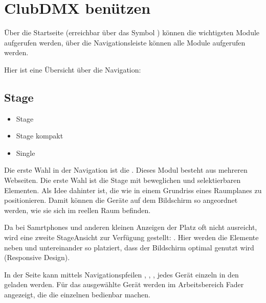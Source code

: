 \documentclass[letterpaper,10pt,ngerman]{sphinxmanual}
\begin{document}
\chapter{ClubDMX benützen}
\label{\detokenize{navigation:clubdmx-benutzen}}\label{\detokenize{navigation:navigation-label}}\label{\detokenize{navigation::doc}}
Über die Startseite (erreichbar über das Symbol ) können die
wichtigsten Module aufgerufen werden, über die Navigationsleiste
können alle Module aufgerufen werden.

Hier ist eine Übersicht über die Navigation:


\section{Stage}
\label{\detokenize{navigation:stage}}\begin{itemize}
\item {} 
Stage

\item {} 
Stage kompakt

\item {} 
Single

\end{itemize}

Die erste Wahl in der Navigation ist die . Dieses Modul besteht aus
mehreren Webseiten. Die erste Wahl ist die Stage mit beweglichen und
selektierbaren Elementen. Als Idee dahinter ist, die 
wie in einem Grundriss eines Raumplanes zu positionieren. Damit können
die Geräte auf dem Bildschirm so angeordnet werden, wie sie sich im reellen
Raum befinden.

\noindent{}

Da bei Samrtphones und anderen kleinen Anzeigen der Platz oft nicht
ausreicht, wird eine zweite Stage\sphinxhyphen{}Ansicht zur Verfügung gestellt:
. Hier werden die Elemente neben\sphinxhyphen{} und untereinander so
platziert, dass der Bildschirm optimal genutzt wird (Responsive Design).

\noindent{}

In der  Seite kann mittels Navigationspfeilen \sphinxcode{\sphinxupquote{\textless{}\textless{}}},
\sphinxcode{\sphinxupquote{\textless{}}}, \sphinxcode{\sphinxupquote{\textgreater{}}}, \sphinxcode{\sphinxupquote{\textgreater{}\textgreater{}}} jedes Gerät
einzeln in den {\hyperref[\detokenize{grundlagen:topcuelabel}]{}} geladen werden.
Für das ausgewählte Gerät werden im
Arbeitsbereich Fader angezeigt, die die einzelnen 
bedienbar machen.
\end{document}

